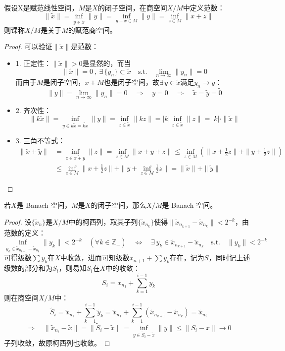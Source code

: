 \begin{definition}[无限维商空间]\label{definition:skj}
假设X是赋范线性空间，$M$是$X$的闭子空间，在商空间$X/M$中定义范数：
\[\|\tilde{x}\|=\mathop \text{inf}\limits_{y \in \tilde{x}}\|y\|=\mathop \text{inf}\limits_{y-x \in M}\|y\|=\mathop \text{inf}\limits_{z \in M}\|x+z\|\]
则课称$X/M$是关于$M$的赋范商空间。
\end{definition}
\begin{proof}
可以验证$\|\tilde{x}\|$是范数：
\begin{itemize}
\item 1. 正定性：$\|\tilde{x}\|>0$是显然的，而当
\[\|\tilde{x}\|=0 \ , \ \exists \, \{y_n\} \subset \tilde{x} \quad \text{s.t.} \quad \lim_{n \to \infty}\|y_n\|=0\]
而由于$M$是闭子空间，$x+M$也是闭子空间，故$\exists \, y \in \tilde{x}$满足$y_n \to y$：
\[\|y\|=\lim_{n \to \infty}\|y_n\|=0 \quad \Rightarrow \quad y=0 \quad \Rightarrow \quad \tilde{x}=\tilde{y}=\tilde{0}\]
\item 2. 齐次性：
\[\|k\tilde{x}\|=\mathop \text{inf}\limits_{y \in k\tilde{x}=\tilde{kx}}\|y\|=\mathop \text{inf}\limits_{z \in \tilde{x}}\|kz\|=|k|\mathop \text{inf}\limits_{z \in \tilde{x}}\|z\|=|k|\cdot\|\tilde{x}\|\] 
\item 3. 三角不等式：
\begin{equation*}
\begin{aligned}
\|\tilde{x}+\tilde{y}\|&=\mathop \text{inf}\limits_{z \in \tilde{x+y}}\|z\|=\mathop \text{inf}\limits_{z \in M}\|x+y+z\| \leq \mathop \text{inf}\limits_{z \in M}\left(\|x+\frac{1}{2}z\|+\|y+\frac{1}{2}z\|\right)\\
&\leq \mathop \text{inf}\limits_{z \in M}\|x+\frac{1}{2}z\|+\|y+\mathop \text{inf}\limits_{z \in M}\frac{1}{2}z\|=\|\tilde{x}\|+\|\tilde{y}\|
\end{aligned}
\end{equation*}
\end{itemize}
\end{proof}

\begin{theorem}\label{theorem:skjwb}
若$X$是 Banach 空间，$M$是$X$的闭子空间，那么$X/M$是 Banach 空间。
\end{theorem}
\begin{proof}
设$\{\tilde{x}_n\}$是$X/M$中的柯西列，取其子列$\{\tilde{x}_{n_k}\}$使得$\|\tilde{x}_{n_{k+1}}-\tilde{x}_{n_k}\|<2^{-k}$，由范数的定义：
\[\mathop \text{inf}\limits_{y_k \in \tilde{x}_{n_{k+1}}-\tilde{x}_{n_k}}\|y_k\|<2^{-k} \quad (\forall k \in \mathbb{Z}_+) \quad \Leftrightarrow \quad \exists \, y_k \in \tilde{x}_{n_{k+1}}-\tilde{x}_{n_k} \quad \text{s.t.} \quad \|y_k\|<2^{-k}\]
可得级数$\sum y_k$在$X$中收敛，进而可知级数$x_{n+1}+\sum y_k$存在，记为$S$，同时记上述级数的部分和为$S_i$，则易知$S_i$在$X$中的收敛：
\[S_i=x_{n_1}+\sum_{k=1}^{i-1}y_k\]
则在商空间$X/M$中：
\[\tilde{S}_i=\tilde{x}_{n_1}+\sum_{k=1}^{i-1}\tilde{y}_k=\tilde{x}_{n_1}+\sum_{k=1}^{i-1}\left(\tilde{x}_{n_{k+1}}-\tilde{x}_{n_k}\right)=\tilde{x}_{n_i}\]
\[\Rightarrow \quad \|\tilde{x}_{n_i}-\tilde{x}\|=\|\tilde{S}_i-\tilde{x}\|=\mathop \text{inf}\limits_{y \in \tilde{S}_i-\tilde{x}}\|y\| \leq \|S_i-x\|\rightarrow 0\]
子列收敛，故原柯西列也收敛。
\end{proof}

